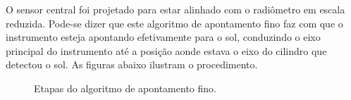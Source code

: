 \documentclass[a4paper,12pt]{article}
\begin{document}
 O sensor central foi projetado para estar alinhado com o radiômetro em escala reduzida. Pode-se dizer que este algoritmo de apontamento fino faz com que o instrumento esteja apontando efetivamente para o sol, conduzindo  o eixo principal do instrumento até a posição aonde estava o eixo do cilindro que detectou o sol. As figuras abaixo ilustram o procedimento.
 \begin{figure}[h]
 	
 	\center
 	\qquad
 	\qquad
 	\caption{Etapas do algoritmo de apontamento fino.}
 	
 \end{figure}
\end{document}

